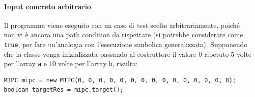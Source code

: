 \documentclass[a4paper, 12pt, oneside]{book}
\theoremstyle{normal}
\begin{document}
\paragraph{Input concreto arbitrario} Il programma viene eseguito con un caso di test scelto arbitrariamente, poiché non vi è ancora una path condition da rispettare (si potrebbe considerare come \verb|true|, per fare un'analogia con l'esecuzione simbolica generalizzata). Supponendo che la classe venga inizializzata passando al costruttore il valore $0$ ripetuto 5 volte per l'array \verb|a| e 10 volte per l'array \verb|b|, risulta:
\begin{lstlisting}[numbers=none, frame=none, basicstyle=\fontsize{10}{12}\selectfont\ttfamily]
MIPC mipc = new MIPC(0, 0, 0, 0, 0, 0, 0, 0, 0, 0, 0, 0, 0, 0, 0);
boolean targetRes = mipc.target();
\end{lstlisting}
\end{document}
